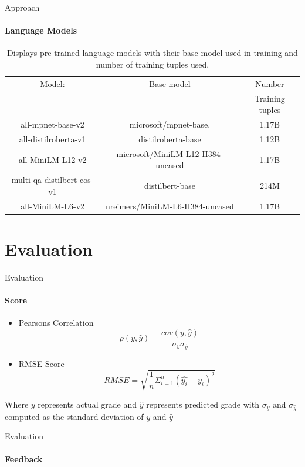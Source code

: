 \documentclass[aspectratio=169]{beamer}
\begin{document}
\begin{frame}{Approach}
\framesubtitle{Language Models}
\begin{table}
	\begin{center}
		\begin{tabular}{ |c|c|c| }
			\hline
			Model: & Base model & Number \\&&Training tuples  
			\\ \hline 
			all-mpnet-base-v2\cite{SBERT} & 	microsoft/mpnet-base. &1.17B
			
			\\ \hline
			all-distilroberta-v1\cite{SBERT} & 	distilroberta-base &1.12B
			\\ \hline
			all-MiniLM-L12-v2\cite{SBERT} & 		microsoft/MiniLM-L12-H384-uncased &1.17B
			\\ \hline
			multi-qa-distilbert-cos-v1\cite{SBERT} & 	distilbert-base &214M
			\\ \hline
			all-MiniLM-L6-v2\cite{SBERT} & 		nreimers/MiniLM-L6-H384-uncased &1.17B
			\\ \hline
		\end{tabular}
		\caption{Displays pre-trained language models with their base model used in training and number of training tuples used\cite{SBERT}.}
		\label{table:language models}
	\end{center}
\end{table}
\end{frame}
\section{Evaluation}
\begin{frame}{Evaluation}
	\framesubtitle{Score}
	\begin{itemize}
		\item Pearsons Correlation
		\begin{equation}
		\label{equation:pearson correlation}
		\rho(y,\hat{y}) = \frac{cov(y,\hat{y})}{\sigma_y \sigma_{\hat{y}}}
		\end{equation}
		\item RMSE Score
		\begin{equation}
		\label{equation:Root mean square error}
		RMSE = \sqrt{\frac{1}{n}\Sigma_{i=1}^n(\hat{y_i} - y_i)^2}
		\end{equation}
	\end{itemize}
Where $y$ represents actual grade and $\hat{y}$ represents predicted grade with $\sigma_y$ and $\sigma_{\hat{y}}$ computed as the standard deviation of $y$ and $\hat{y}$
\end{frame}
\begin{frame}{Evaluation}
\framesubtitle{Feedback}
\end{frame}
\end{document}
